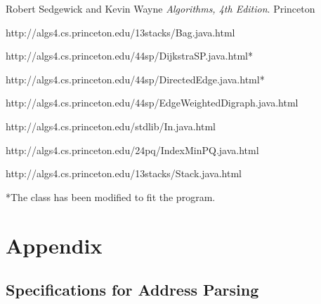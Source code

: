 \documentclass[a4paper,10pt,titlepage]{article}
\begin{document}
	\begin{thebibliography}{9}
  	Robert Sedgewick and Kevin Wayne
  	\emph{Algorithms, 4th Edition}.
  	Princeton

	http://algs4.cs.princeton.edu/13stacks/Bag.java.html
	
	http://algs4.cs.princeton.edu/44sp/DijkstraSP.java.html*  	
	
	http://algs4.cs.princeton.edu/44sp/DirectedEdge.java.html*
	
	http://algs4.cs.princeton.edu/44sp/EdgeWeightedDigraph.java.html
  	
	http://algs4.cs.princeton.edu/stdlib/In.java.html
	
	http://algs4.cs.princeton.edu/24pq/IndexMinPQ.java.html
	
	 												http://algs4.cs.princeton.edu/13stacks/Stack.java.html
	
	\end{thebibliography}
	*The class has been modified to fit the program.

	\section{Appendix}

	\subsection{Specifications for Address Parsing}
\end{document}
